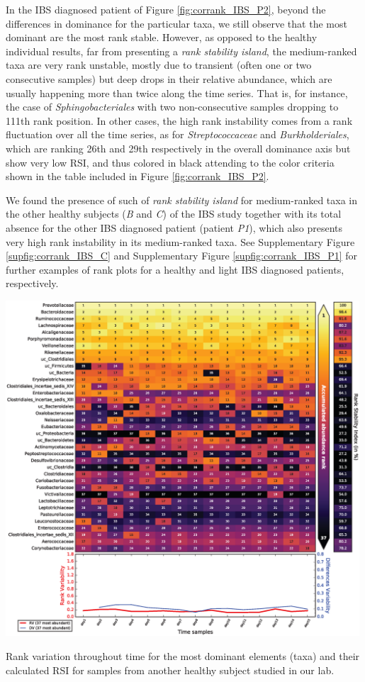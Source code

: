 In the IBS diagnosed patient of Figure \ref{fig:corrank_IBS_P2}, beyond the differences in dominance for the particular taxa, we still observe that the most dominant are the most rank stable. However, as opposed to the healthy individual results, far from presenting a \emph{rank stability island}, the medium-ranked taxa are very rank unstable, mostly due to transient (often one or two consecutive samples) but deep drops in their relative abundance, which are usually happening more than twice along the time series. That is, for instance, the case of \emph{Sphingobacteriales} with two non-consecutive samples dropping to 111th rank position. In other cases, the high rank instability comes from a rank fluctuation over all the time series, as for \emph{Streptococcaceae} and \emph{Burkholderiales}, which are ranking 26th and 29th respectively in the overall dominance axis but show very low RSI, and thus colored in black attending to the color criteria shown in the table included in Figure \ref{fig:corrank_IBS_P2}.

We found the presence of such of \emph{rank stability island} for medium-ranked taxa in the other healthy subjects (\emph{B} and \emph{C}) of the IBS study\cite{IBS} together with its total absence for the other IBS diagnosed patient (patient \emph{P1}), which also presents very high rank instability in its medium-ranked taxa. See Supplementary Figure \ref{supfig:corrank_IBS_C} and Supplementary Figure \ref{supfig:corrank_IBS_P1} for further examples of rank plots for a healthy and light IBS diagnosed patients, respectively.

\begin{supfig}
	\centering
	\includegraphics[width=0.99\textwidth]{figs/supfig_corrank_IBS_C.eps}
	\caption{Rank variation throughout time for the most dominant elements (taxa) and their calculated RSI for samples from another healthy subject studied in our lab\cite{IBS}.}
	\label{supfig:corrank_IBS_C}
\end{supfig}

